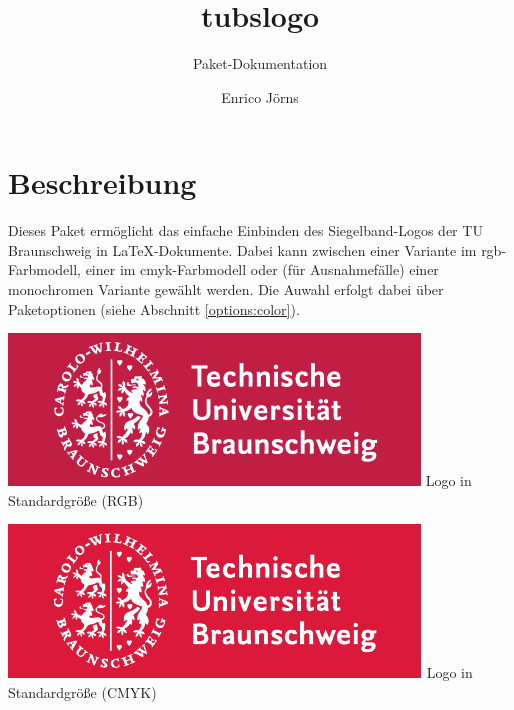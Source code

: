 \documentclass{scrartcl}
\title{tubslogo}
\subtitle{Paket-Dokumentation}
\author{Enrico Jörns}
\begin{document}
\maketitle

\section{Beschreibung}

Dieses Paket ermöglicht das einfache Einbinden des Siegelband-Logos
der TU Braunschweig in \LaTeX-Dokumente.
Dabei kann zwischen einer Variante im rgb-Farbmodell, einer im
cmyk-Farbmodell oder (für Ausnahmefälle) einer monochromen Variante gewählt
werden. Die Auwahl erfolgt dabei über Paketoptionen
(siehe Abschnitt \ref{options:color}).

\begin{minipage}{0.5\textwidth}
  \centering
  \includegraphics[width=\tubslogoBaseWidth]{TUBraunschweig-rgb}
  {\sffamily Logo in Standardgröße (RGB)}
\end{minipage}
\begin{minipage}{0.5\textwidth}
  \centering
  \includegraphics[width=\tubslogoBaseWidth]{TUBraunschweig_4C}
  {\sffamily Logo in Standardgröße (CMYK)}
\end{minipage}
\end{document}
